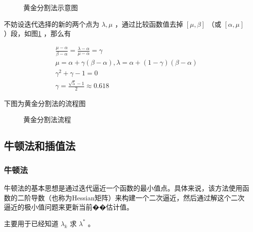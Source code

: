 \documentclass{book}
\begin{document}
\begin{figure}[ht]
    \centering
    \caption{黄金分割法示意图}
    \label{fig:Golden section method}
\end{figure}

不妨设迭代选择的新的两个点为 $\lambda,\mu$ ，通过比较函数值去掉 $[\mu,\beta]$ （或 $[\alpha,\mu]$ ）段，如图\ref{fig:Golden section method} ，那么有

\begin{gather*}
    \frac{\mu-\alpha}{\beta-\alpha}=\frac{\lambda-\alpha}{\mu-\alpha}=\gamma       \\
    \mu=\alpha+\gamma(\beta-\alpha),\lambda=\alpha+(1-\gamma)(\beta-\alpha) \\
    \gamma^2+\gamma-1 =0                                       \\
    \gamma=\frac{\sqrt{5}-1}{2}\approx0.618
\end{gather*}

下图为黄金分割法的流程图

\begin{figure}[ht]
    \centering
    
    \caption{黄金分割法流程}
    \label{fig:flow of Golden section method}
\end{figure}

\subsection{牛顿法和插值法}

\subsubsection{牛顿法}

牛顿法的基本思想是通过迭代逼近一个函数的最小值点。具体来说，该方法使用函数的二阶导数（也称为Hessian矩阵）来构建一个二次逼近，然后通过解这个二次逼近的极小值问题来更新当前��估计值。

主要用于已经知道 $\lambda_k$ 求 $\lambda^*$ 。
\end{document}
